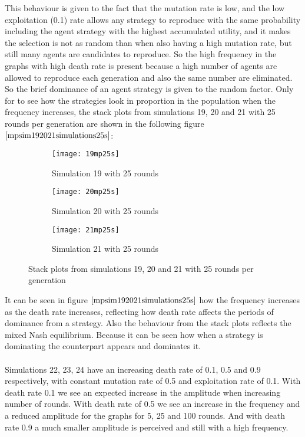 This behaviour is given to the fact that the mutation rate is low, and the low exploitation (0.1) rate allows any  strategy to reproduce with the same probability including the agent strategy with the highest accumulated utility, and it makes the selection is not as random than when also having a high mutation rate, but still many agents are candidates to reproduce. So the high frequency in the graphs with high death rate is present because  a high number of agents are allowed to reproduce each generation and also the same number are eliminated. So the brief dominance of an agent strategy is given to the random factor. 
Only for to see how the strategies look in proportion in the population when the frequency increases, the stack plots from simulations 19, 20 and 21 with 25 rounds per generation are shown in the following figure $\ref{mpsim192021simulations25s}$:

\begin{figure}[H]       
    \centering
    \begin{subfigure}[b]{0.3\textwidth}
	\centering
	{\texttt{[image: 19mp25s]}}   
    	\caption{Simulation 19 with 25 rounds}
	\label{fig:mpsim19s25}
    \end{subfigure}
    \hfill
    \begin{subfigure}[b]{0.3\textwidth}
	\centering
	{\texttt{[image: 20mp25s]}}   
    	\caption{Simulation 20 with 25 rounds}
	\label{fig:mpsim20s25}
    \end{subfigure}
    \hfill
    \begin{subfigure}[b]{0.3\textwidth}
	\centering
	{\texttt{[image: 21mp25s]}}   
    	\caption{Simulation 21 with 25 rounds}
	\label{fig:mpsim21s25}
    \end{subfigure}
    \caption{Stack plots from simulations 19, 20 and 21 with 25 rounds per generation}
    \label{mpsim192021simulations25s}
\end{figure}
It can be seen in figure $\ref{mpsim192021simulations25s}$ how the frequency increases as the death rate increases, reflecting how death rate affects the periods of dominance from a strategy. Also the behaviour from the stack plots reflects the mixed Nash equilibrium. Because it can be seen how when a strategy is dominating the counterpart appears and dominates it.
\\\\Simulations 22, 23, 24 have an increasing death rate of 0.1, 0.5 and 0.9 respectively, with constant mutation rate of 0.5 and exploitation rate of 0.1. With death rate 0.1 we see an expected increase in the amplitude when increasing number of rounds. With death rate of 0.5 we see an increase in the frequency and a reduced amplitude for the graphs for 5, 25 and 100 rounds. And with death rate 0.9 a much smaller amplitude is perceived and still with a high frequency.

